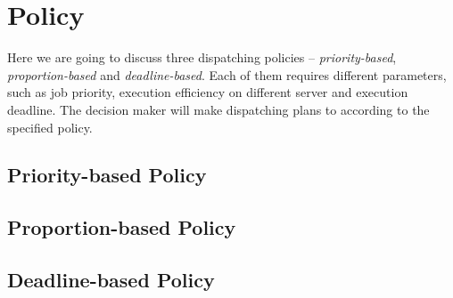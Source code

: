\chapter{Policy}

Here we are going to discuss three dispatching policies --
\emph{priority-based}, \emph{proportion-based} and
\emph{deadline-based}.  Each of them requires different parameters, such
as job priority, execution efficiency on different server and execution
deadline.  The decision maker will make dispatching plans to according
to the specified policy.

\section{Priority-based Policy}

\section{Proportion-based Policy}

\section{Deadline-based Policy}
